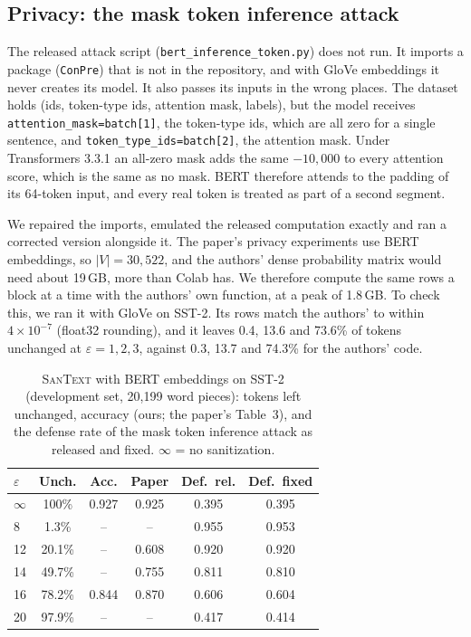 \documentclass[11pt]{article}
\newcommand{\santext}{\textsc{SanText}}
\begin{document}
\subsection{Privacy: the mask token inference attack}
The released attack script (\texttt{bert\_inference\_token.py}) does not run. It imports a package (\texttt{ConPre}) that is not in the repository, and with GloVe embeddings it never creates its model. It also passes its inputs in the wrong places. The dataset holds (ids, token-type ids, attention mask, labels), but the model receives \texttt{attention\_mask=batch[1]}, the token-type ids, which are all zero for a single sentence, and \texttt{token\_type\_ids=batch[2]}, the attention mask. Under Transformers 3.3.1 an all-zero mask adds the same $-10{,}000$ to every attention score, which is the same as no mask. BERT therefore attends to the padding of its 64-token input, and every real token is treated as part of a second segment.

We repaired the imports, emulated the released computation exactly and ran a corrected version alongside it. The paper's privacy experiments use BERT embeddings, so $|V| = 30{,}522$, and the authors' dense probability matrix would need about 19\,GB, more than Colab has. We therefore compute the same rows a block at a time with the authors' own function, at a peak of 1.8\,GB. To check this, we ran it with GloVe on SST-2. Its rows match the authors' to within $4\times10^{-7}$ (float32 rounding), and it leaves 0.4, 13.6 and 73.6\% of tokens unchanged at $\varepsilon = 1, 2, 3$, against 0.3, 13.7 and 74.3\% for the authors' code.

\begin{table}[t]
\centering\small
\setlength{\tabcolsep}{4.5pt}
\begin{tabular}{@{}lccccc@{}}
\toprule
$\varepsilon$ & Unch. & Acc. & Paper & Def.\ rel. & Def.\ fixed \\
\midrule
$\infty$ & 100\% & 0.927 & 0.925 & 0.395 & 0.395 \\
8 & 1.3\% & -- & -- & 0.955 & 0.953 \\
12 & 20.1\% & -- & 0.608 & 0.920 & 0.920 \\
14 & 49.7\% & -- & 0.755 & 0.811 & 0.810 \\
16 & 78.2\% & 0.844 & 0.870 & 0.606 & 0.604 \\
20 & 97.9\% & -- & -- & 0.417 & 0.414 \\
\bottomrule
\end{tabular}
\caption{\santext{} with BERT embeddings on SST-2 (development set, 20,199 word pieces): tokens left unchanged, accuracy (ours; the paper's Table~3), and the defense rate of the mask token inference attack as released and fixed. $\infty$ = no sanitization.}
\label{tab:attack}
\end{table}
\end{document}
